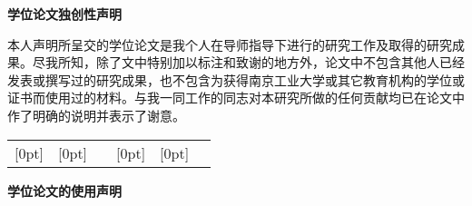   
{
	\pagestyle{empty}
	\newpage
	\vspace*{20pt}
	\begin{center}{\songti \textbf{学位论文独创性声明}}\end{center}
	\par\vspace*{30pt}
	\renewcommand{\baselinestretch}{2}
	{ \songti %
		
		
		\noindent 本人声明所呈交的学位论文是我个人在导师指导下进行的研究工作及取得的研究成果。尽我所知，除了文中特别加以标注和致谢的地方外，论文中不包含其他人已经发表或撰写过的研究成果，也不包含为获得南京工业大学或其它教育机构的学位或证书而使用过的材料。与我一同工作的同志对本研究所做的任何贡献均已在论文中作了明确的说明并表示了谢意。\\
		\begin{tabular}{lp{3cm}p{0cm}lp{3cm}l}
			\raisebox{-0.5ex}[0pt]{\makebox[2.5cm][s]{研\hfill 究\hfill \hfill 生\hfill 签\hfill 名：}} & {}\hfill\raisebox{-0.5ex}[0pt]{}\hfill{} &  &
			\raisebox{-0.5ex}[0pt]{\makebox[2.5cm][s]{日\hfill 期：}} & {}\hfill\raisebox{-0.5ex}[0pt]{}\hfill{} & \\\cline{2-2}\cline{5-5}
		\end{tabular}
		
		
		\vskip2cm
		\par
	}
	
	\begin{center}{\songti \textbf{学位论文的使用声明}}\end{center}
	\par\vspace*{30pt}
	\renewcommand{\baselinestretch}{2}
	{ \songti %
		
}}
